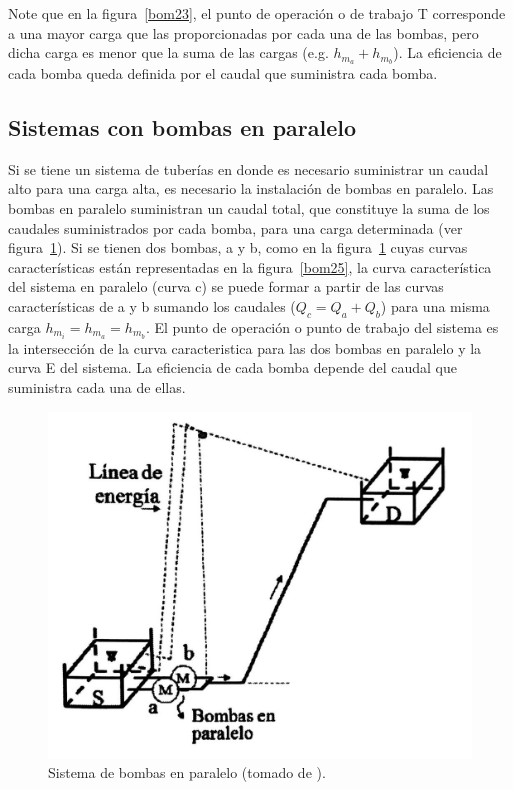 \documentclass[11pt, oneside]{article}
\begin{document}
Note que en la figura~\ref{bom23}, el punto de operaci\'on o de trabajo T corresponde a una mayor carga que las proporcionadas por cada una de las bombas, pero dicha carga es menor que la suma de las cargas (e.g. $h_{m_a}+ h_{m_b}$). La eficiencia de cada bomba queda definida por el caudal que suministra cada bomba. 


\subsection{Sistemas con bombas en paralelo}
Si se tiene un sistema de tuber\'ias en donde es necesario suministrar un caudal alto para una carga alta, es necesario la instalaci\'on de bombas en paralelo. Las bombas en paralelo suministran un caudal total, que constituye la suma de los caudales suministrados por cada bomba, para una carga determinada (ver figura~\ref{bom24}). Si se tienen dos bombas, a y b, como en la figura~\ref{bom24} cuyas curvas caracter\'isticas est\'an representadas en la figura~\ref{bom25}, la curva caracter\'istica del sistema en paralelo (curva c) se puede formar a partir de las curvas caracter\'isticas de a y b sumando los caudales ($Q_c = Q_a + Q_b$) para una misma carga $h_{m_i}= h_{m_a}=h_{m_b}$. El punto de operaci\'on o punto de trabajo del sistema es la intersecci\'on de la curva caracteristica para las dos bombas en paralelo y la curva E del sistema. La eficiencia de cada bomba depende del caudal que suministra cada una de ellas. 

\begin{figure}[h]
\centering
\includegraphics[width=12cm]{./figs/bom24.jpeg}
\caption{Sistema de bombas en paralelo (tomado de \cite{agudelo2011mecanica}).} 
\label{bom24}
\end{figure}
\end{document}

